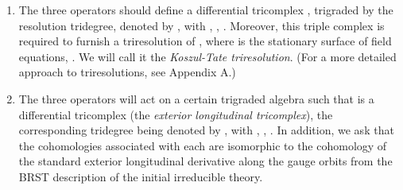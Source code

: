 \documentclass[a4paper,12pt]{article}
\begin{document}
\begin{enumerate}
\item  The three operators \coordHE{} should
define a differential tricomplex \coordHE{}, trigraded by the resolution tridegree,
denoted by \coordHE{}, with \coordHE{}, \coordHE{}, \coordHE{}. Moreover, this triple complex is required to furnish a
triresolution of \coordHE{}, where \myHighlight{$\Sigma $}\coordHE{} is the
stationary surface of field equations, \coordHE{}. We will call it the \textit{Koszul-Tate triresolution}.
(For a more detailed approach to triresolutions, see Appendix A.)

\item  The three operators \coordHE{} will act on a
certain trigraded algebra \coordHE{} such that \coordHE{} is a differential
tricomplex (the \textit{exterior longitudinal tricomplex}), the
corresponding tridegree being denoted by \coordHE{}, with \coordHE{}, \coordHE{}, \coordHE{}. In addition, we ask that the cohomologies associated with
each \coordHE{} are isomorphic to the cohomology of
the standard exterior longitudinal derivative along the gauge orbits from
the BRST description of the initial irreducible theory.
\end{enumerate}
\end{document}
